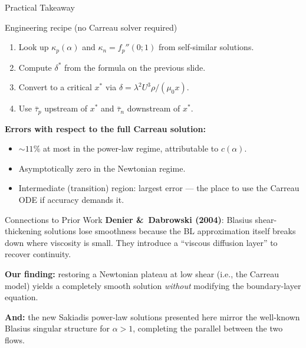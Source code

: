 \documentclass[10pt,aspectratio=169]{beamer}
\begin{document}
\begin{frame}{Practical Takeaway}
  \begin{block}{Engineering recipe (no Carreau solver required)}
    \begin{enumerate}
      \item Look up $\kappa_p(\alpha)$ and $\kappa_n=f_p''(0;1)$ from self-similar solutions.
      \item Compute $\delta^*$ from the formula on the previous slide.
      \item Convert to a critical $x^*$ via $\delta = \lambda^2 U^3\rho/(\mu_0 x)$.
      \item Use $\bar\tau_p$ upstream of $x^*$ and $\bar\tau_n$ downstream of $x^*$.
    \end{enumerate}
  \end{block}
  \vspace{0.5em}
  \textbf{Errors with respect to the full Carreau solution:}
  \begin{itemize}
    \item $\sim 11\%$ at most in the power-law regime, attributable to $c(\alpha)$.
    \item Asymptotically zero in the Newtonian regime.
    \item Intermediate (transition) region: largest error --- the place to use the Carreau ODE if accuracy demands it.
  \end{itemize}
\end{frame}

\begin{frame}{Connections to Prior Work}
  \textbf{Denier \&\ Dabrowski (2004)}: Blasius shear-thickening solutions lose smoothness because the BL
  approximation itself breaks down where viscosity is small. They introduce a ``viscous diffusion layer''
  to recover continuity.
  \vspace{0.6em}

  \textbf{Our finding:} restoring a Newtonian plateau at low shear (i.e., the Carreau model)
  yields a completely smooth solution \emph{without} modifying the boundary-layer equation.
  \vspace{0.6em}

  \textbf{And:} the new Sakiadis power-law solutions presented here mirror the well-known
  Blasius singular structure for $\alpha>1$, completing the parallel between the two flows.
\end{frame}
\end{document}
